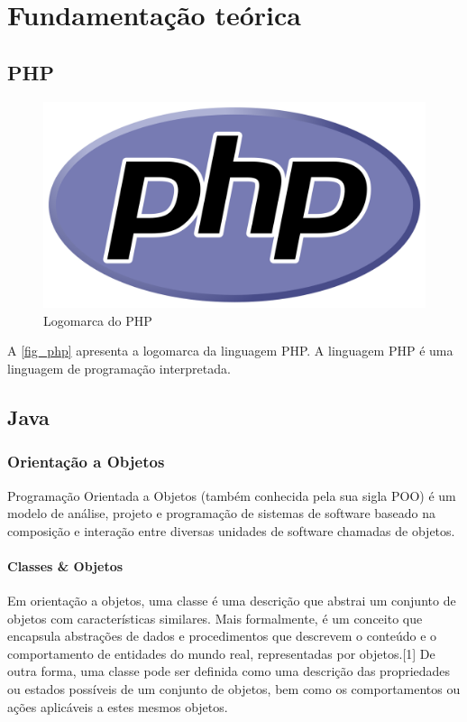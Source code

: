 \chapter{Fundamentação teórica}

\section{PHP}
\lipsum[1]

\begin{figure}[htb]
	\caption{\label{fig_php} Logomarca do PHP}
	\begin{center}
	    \includegraphics[width=0.5\linewidth]{imagens/php.png}
	\end{center}
\end{figure}

A \autoref{fig_php} apresenta a logomarca da linguagem PHP. A linguagem PHP é uma linguagem de programação interpretada.

\lipsum[2-3]

\section{Java}
\lipsum[1]

\subsection{Orientação a Objetos}

Programação Orientada a Objetos (também conhecida pela sua sigla POO) é um modelo de análise, projeto e programação de sistemas de software baseado na composição e interação entre diversas unidades de software chamadas de objetos.

\lipsum[2-3]

\subsubsection{Classes \& Objetos}

Em orientação a objetos, uma classe é uma descrição que abstrai um conjunto de objetos com características similares. Mais formalmente, é um conceito que encapsula abstrações de dados e procedimentos que descrevem o conteúdo e o comportamento de entidades do mundo real, representadas por objetos.[1] De outra forma, uma classe pode ser definida como uma descrição das propriedades ou estados possíveis de um conjunto de objetos, bem como os comportamentos ou ações aplicáveis a estes mesmos objetos.


